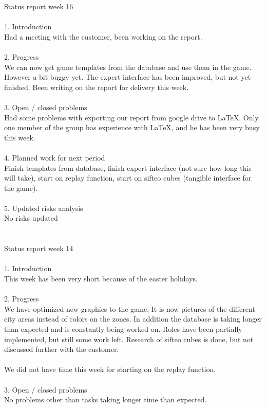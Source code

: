 \noindent Status report week 16\\
\\
1. Introduction\\
Had a meeting with the customer, been working on the report.\\
\\
2. Progress\\
We can now get game templates from the database and use them in the game. However a bit buggy yet. The expert interface has been improved, but not yet finished. Been writing on the report for delivery this week. \\
\\
3. Open / closed problems\\
Had some problems with exporting our report from google drive to LaTeX. Only one member of the group has experience with LaTeX, and he has been very busy this week. \\
\\
4. Planned work for next period\\
Finish templates from database, finish expert interface (not sure how long this will take), start on replay function, start on sifteo cubes (tangible interface for the game). \\
\\
5. Updated risks analysis\\
No risks updated\\
\\
\\
Status report week 14\\
\\
1. Introduction\\
This week has been very short because of the easter holidays. \\
\\
2. Progress\\
We have optimized new graphics to the game. It is now pictures of the different city areas instead of colors on the zones. In addition the database is taking longer than expected and is constantly being worked on. Roles have been partially implemented, but still some work left. Research of sifteo cubes is done, but not discussed further with the customer. \\
\\
We did not have time this week for starting on the replay function.\\
\\
3. Open / closed problems\\
No problems other than tasks taking longer time than expected. \\
